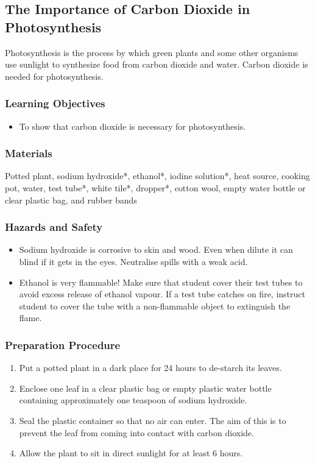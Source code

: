 \subsection{The Importance of Carbon Dioxide in Photosynthesis}
Photosynthesis is the process by which green plants and some other organisms use sunlight to synthesize food from carbon dioxide and water. Carbon dioxide is needed for photosynthesis.

\subsubsection*{Learning Objectives}
\begin{itemize}
\item{To show that carbon dioxide is necessary for photosynthesis.}
\end{itemize}

\subsubsection*{Materials}
Potted plant, sodium hydroxide*, ethanol*, iodine solution*, heat source, cooking pot, water, test tube*, white tile*, dropper*, cotton wool, empty water bottle or clear plastic bag, and rubber bands

\subsubsection*{Hazards and Safety}
\begin{itemize}
\item{Sodium hydroxide is corrosive to skin and wood. Even when dilute it can blind if it gets in the eyes. Neutralise spills with a weak acid.}
\item{Ethanol is very flammable! Make sure that student cover their test tubes to avoid excess release of ethanol vapour. If a test tube catches on fire, instruct student to cover the tube with a non-flammable object to extinguish the flame.}
\end{itemize}

\subsubsection*{Preparation Procedure}
\begin{enumerate}
\item{Put a potted plant in a dark place for 24 hours to de-starch its leaves.}
\item{Enclose one leaf in a clear plastic bag or empty plastic water bottle containing approximately one teaspoon of sodium hydroxide.}
\item{Seal the plastic container so that no air can enter. The aim of this is to prevent the leaf from coming into contact with carbon dioxide.}
\item{Allow the plant to sit in direct sunlight for at least 6 hours.}
\end{enumerate}

